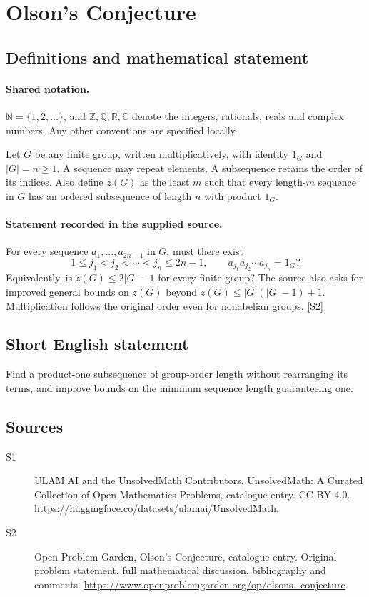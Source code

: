 \documentclass[11pt]{article}
\newcommand{\sref}[2]{\hyperlink{source:#1:#2}{[S#2]}}
\begin{document}
\section{Olson's Conjecture}\label{statement}

\subsection{Definitions and mathematical statement}

\paragraph{Shared notation.}$\mathbb N=\{1,2,\ldots\}$, and $\mathbb Z,\mathbb Q,\mathbb R,\mathbb C$ denote the integers, rationals, reals and complex numbers. Any other conventions are specified locally.


Let $G$ be any finite group, written multiplicatively, with identity $1_G$ and $|G|=n\ge1$. A sequence may repeat elements. A subsequence retains the order of its indices. Also define $z(G)$ as the least $m$ such that every length-$m$ sequence in $G$ has an ordered subsequence of length $n$ with product $1_G$.
\paragraph{Statement recorded in the supplied source.}
For every sequence $a_1,\ldots,a_{2n-1}$ in $G$, must there exist
\[
 1\le j_1<j_2<\cdots<j_n\le2n-1,
 \qquad a_{j_1}a_{j_2}\cdots a_{j_n}=1_G?
\]
Equivalently, is $z(G)\le2|G|-1$ for every finite group? The source also asks for improved general bounds on $z(G)$ beyond $z(G)\le|G|(|G|-1)+1$. Multiplication follows the original order even for nonabelian groups. \sref{statement}{2}
\subsection{Short English statement}
Find a product-one subsequence of group-order length without rearranging its terms, and improve bounds on the minimum sequence length guaranteeing one.
\subsection{Sources}
\begin{description}
\item[\hypertarget{source:statement:1}{S1}] ULAM.AI and the UnsolvedMath Contributors, UnsolvedMath: A Curated Collection of Open Mathematics Problems, catalogue entry. CC BY 4.0. \url{https://huggingface.co/datasets/ulamai/UnsolvedMath}.
\item[\hypertarget{source:statement:2}{S2}] Open Problem Garden, Olson's Conjecture, catalogue entry. Original problem statement, full mathematical discussion, bibliography and comments. \url{https://www.openproblemgarden.org/op/olsons_conjecture}.
\end{description}
\label{end:statement}
\end{document}
